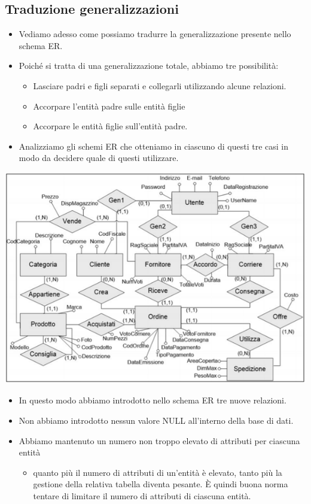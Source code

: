 \subsection{Traduzione generalizzazioni}
\begin{itemize}
	\item Vediamo adesso come possiamo tradurre la generalizzazione presente nello schema ER. 
	\item Poiché si tratta di una generalizzazione totale, abbiamo tre possibilità:
	\begin{itemize}
		\item Lasciare padri e figli separati e collegarli utilizzando
		alcune relazioni.
		\item Accorpare l’entità padre sulle entità figlie
		\item Accorpare le entità figlie sull’entità padre. 
	\end{itemize}
	\item Analizziamo gli schemi ER che otteniamo in ciascuno di questi tre casi in modo da decidere quale di questi utilizzare.
\end{itemize}
\begin{center}
	\includegraphics{images/97.PNG}
\end{center}
\begin{itemize}
	\item In questo modo abbiamo introdotto nello schema ER tre nuove relazioni. 
	\item Non abbiamo introdotto nessun valore NULL all’interno della base di dati.
	\item Abbiamo mantenuto un numero non troppo elevato di attributi per ciascuna entità
	\begin{itemize}\item quanto più il numero di attributi di un’entità è elevato, tanto più la gestione della relativa tabella diventa pesante. È quindi buona norma tentare di limitare il numero di attributi di ciascuna entità.\end{itemize}
\end{itemize}
